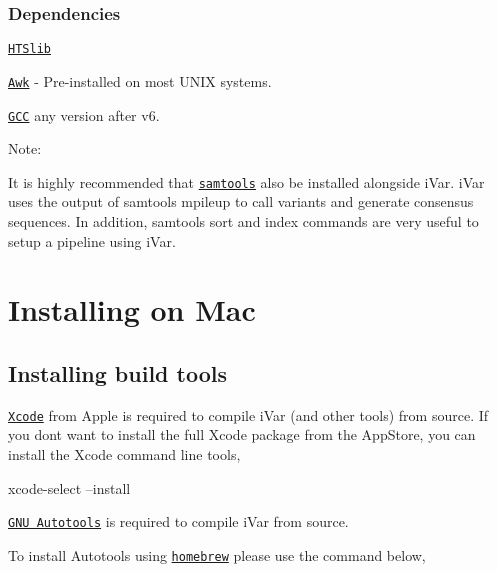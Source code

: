 \subsubsection*{Dependencies}


\begin{DoxyItemize}
\item \href{http://www.htslib.org/download/}{\tt H\+T\+Slib}
\item \href{https://www.cs.princeton.edu/~bwk/btl.mirror/}{\tt Awk} -\/ Pre-\/installed on most U\+N\+IX systems.
\item \href{https://gcc.gnu.org/}{\tt G\+CC} any version after v6.
\end{DoxyItemize}

Note\+:
\begin{DoxyItemize}
\item It is highly recommended that \href{https://github.com/samtools/samtools}{\tt samtools} also be installed alongside i\+Var. i\+Var uses the output of samtools mpileup to call variants and generate consensus sequences. In addition, samtools {\ttfamily sort} and {\ttfamily index} commands are very useful to setup a pipeline using i\+Var.
\end{DoxyItemize}\hypertarget{installpage_autotoc_md0}{}\section{Installing on Mac}\label{installpage_autotoc_md0}
\hypertarget{installpage_autotoc_md1}{}\subsection{Installing build tools}\label{installpage_autotoc_md1}
\href{https://developer.apple.com/xcode/}{\tt Xcode} from Apple is required to compile i\+Var (and other tools) from source. If you don\textquotesingle{}t want to install the full Xcode package from the App\+Store, you can install the Xcode command line tools,


\begin{DoxyCode}
xcode-select --install
\end{DoxyCode}


\href{https://www.gnu.org/software/automake/manual/html_node/Autotools-Introduction.html#Autotools-Introduction}{\tt G\+NU Autotools} is required to compile i\+Var from source.

To install Autotools using \href{https://brew.sh/}{\tt homebrew} please use the command below,


